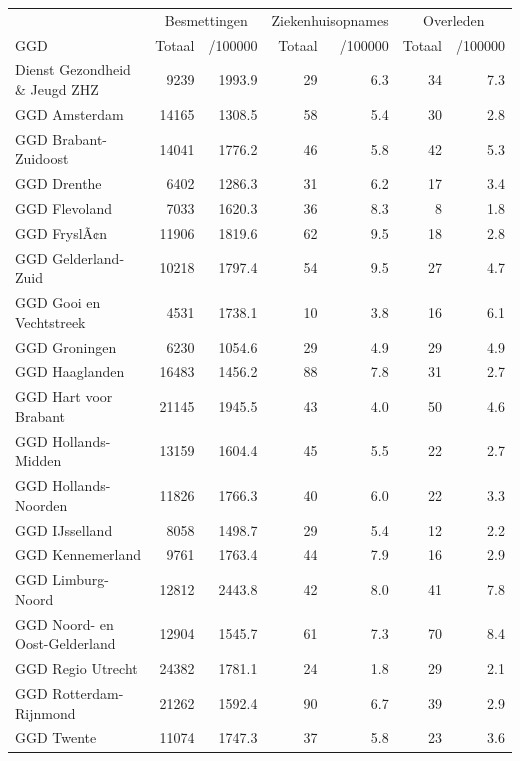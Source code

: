 \documentclass[
  english,
  man,floatsintext]{apa6}
\begin{document}
\begin{table}
\centering\begingroup\fontsize{10}{12}\selectfont

\begin{threeparttable}
\begin{tabular}{lrrrrrr}
\toprule
\multicolumn{1}{c}{ } & \multicolumn{2}{c}{Besmettingen} & \multicolumn{2}{c}{Ziekenhuisopnames} & \multicolumn{2}{c}{Overleden} \\
\cmidrule(l{3pt}r{3pt}){2-3} \cmidrule(l{3pt}r{3pt}){4-5} \cmidrule(l{3pt}r{3pt}){6-7}
GGD & Totaal & /100000 & Totaal & /100000 & Totaal & /100000\\
\midrule
Dienst Gezondheid \& Jeugd ZHZ & 9239 & 1993.9 & 29 & 6.3 & 34 & 7.3\\
GGD Amsterdam & 14165 & 1308.5 & 58 & 5.4 & 30 & 2.8\\
GGD Brabant-Zuidoost & 14041 & 1776.2 & 46 & 5.8 & 42 & 5.3\\
GGD Drenthe & 6402 & 1286.3 & 31 & 6.2 & 17 & 3.4\\
GGD Flevoland & 7033 & 1620.3 & 36 & 8.3 & 8 & 1.8\\
GGD FryslÃ¢n & 11906 & 1819.6 & 62 & 9.5 & 18 & 2.8\\
GGD Gelderland-Zuid & 10218 & 1797.4 & 54 & 9.5 & 27 & 4.7\\
GGD Gooi en Vechtstreek & 4531 & 1738.1 & 10 & 3.8 & 16 & 6.1\\
GGD Groningen & 6230 & 1054.6 & 29 & 4.9 & 29 & 4.9\\
GGD Haaglanden & 16483 & 1456.2 & 88 & 7.8 & 31 & 2.7\\
GGD Hart voor Brabant & 21145 & 1945.5 & 43 & 4.0 & 50 & 4.6\\
GGD Hollands-Midden & 13159 & 1604.4 & 45 & 5.5 & 22 & 2.7\\
GGD Hollands-Noorden & 11826 & 1766.3 & 40 & 6.0 & 22 & 3.3\\
GGD IJsselland & 8058 & 1498.7 & 29 & 5.4 & 12 & 2.2\\
GGD Kennemerland & 9761 & 1763.4 & 44 & 7.9 & 16 & 2.9\\
GGD Limburg-Noord & 12812 & 2443.8 & 42 & 8.0 & 41 & 7.8\\
GGD Noord- en Oost-Gelderland & 12904 & 1545.7 & 61 & 7.3 & 70 & 8.4\\
GGD Regio Utrecht & 24382 & 1781.1 & 24 & 1.8 & 29 & 2.1\\
GGD Rotterdam-Rijnmond & 21262 & 1592.4 & 90 & 6.7 & 39 & 2.9\\
GGD Twente & 11074 & 1747.3 & 37 & 5.8 & 23 & 3.6\\

\end{tabular}
\end{threeparttable}
\end{table}
\end{document}
